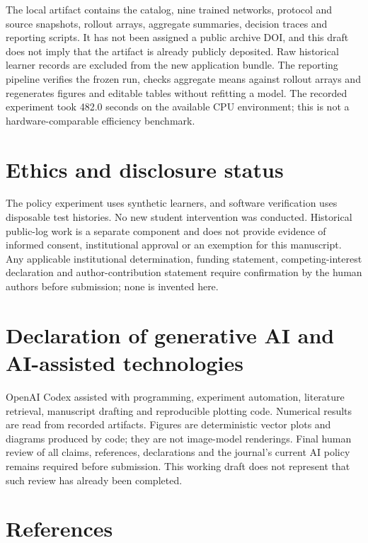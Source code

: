 \documentclass[preprint,11pt,authoryear]{elsarticle}
\begin{document}
The local artifact contains the catalog, nine trained networks, protocol and source snapshots, rollout arrays, aggregate summaries, decision traces and reporting scripts. It has not been assigned a public archive DOI, and this draft does not imply that the artifact is already publicly deposited. Raw historical learner records are excluded from the new application bundle. The reporting pipeline verifies the frozen run, checks aggregate means against rollout arrays and regenerates figures and editable tables without refitting a model. The recorded experiment took 482.0 seconds on the available CPU environment; this is not a hardware-comparable efficiency benchmark.

\section*{Ethics and disclosure status}

The policy experiment uses synthetic learners, and software verification uses disposable test histories. No new student intervention was conducted. Historical public-log work is a separate component and does not provide evidence of informed consent, institutional approval or an exemption for this manuscript. Any applicable institutional determination, funding statement, competing-interest declaration and author-contribution statement require confirmation by the human authors before submission; none is invented here.

\section*{Declaration of generative AI and AI-assisted technologies}

OpenAI Codex assisted with programming, experiment automation, literature retrieval, manuscript drafting and reproducible plotting code. Numerical results are read from recorded artifacts. Figures are deterministic vector plots and diagrams produced by code; they are not image-model renderings. Final human review of all claims, references, declarations and the journal's current AI policy remains required before submission. This working draft does not represent that such review has already been completed.

\section*{References}
\end{document}

